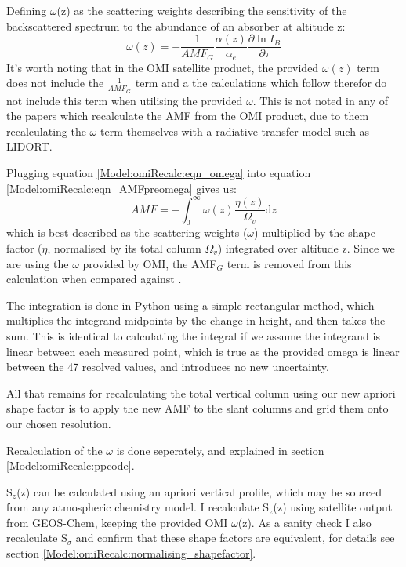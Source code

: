     Defining $\omega$(z) as the scattering weights describing the sensitivity of the backscattered spectrum to the abundance of an absorber at altitude z:
    \begin{equation} \label{Model:omiRecalc:eqn_omega}
    \omega(z) = -\frac{1}{AMF_G} \frac{\alpha(z)}{\alpha_e} \frac{\partial \ln{I_B}}{\partial \tau}
    \end{equation}
    It's worth noting that in the OMI satellite product, the provided $\omega(z)$ term does not include the $\frac{1}{AMF_G}$ term and a the calculations which follow therefor do not include this term when utilising the provided $\omega$.
    This is not noted in any of the papers which recalculate the AMF from the OMI product, due to them recalculating the $\omega$ term themselves with a radiative transfer model such as LIDORT.
    
    Plugging equation \ref{Model:omiRecalc:eqn_omega} into equation \ref{Model:omiRecalc:eqn_AMFpreomega} gives us:
    \begin{equation}
      AMF = -\int_0^\infty{ \omega(z) \frac{\eta(z)}{\Omega_v} \mathrm{d}z}
    \end{equation}
    which is best described as the scattering weights ($\omega$) multiplied by the shape factor ($\eta$, normalised by its total column $\Omega_v$) integrated over altitude z.
    Since we are using the $\omega$ provided by OMI, the AMF$_G$ term is removed from this calculation when compared against \textcite{Palmer2001}.
    
    The integration is done in Python using a simple rectangular method, which multiplies the integrand midpoints by the change in height, and then takes the sum.
    This is identical to calculating the integral if we assume the integrand is linear between each measured point, which is true as the provided omega is linear between the 47 resolved values, and introduces no new uncertainty.
    
    
    
    All that remains for recalculating the total vertical column using our new apriori shape factor is to apply the new AMF to the slant columns and grid them onto our chosen resolution.
    
    
    Recalculation of the $\omega$ is done seperately, and explained in section \ref{Model:omiRecalc:ppcode}.
    
    S$_z$(z) can be calculated using an apriori vertical profile, which may be sourced from any atmospheric chemistry model.
    I recalculate S$_z$(z) using satellite output from GEOS-Chem, keeping the provided OMI $\omega$(z).
    As a sanity check I also recalculate S$_\sigma$ and confirm that these shape factors are equivalent, for details see section \ref{Model:omiRecalc:normalising_shapefactor}.
    
